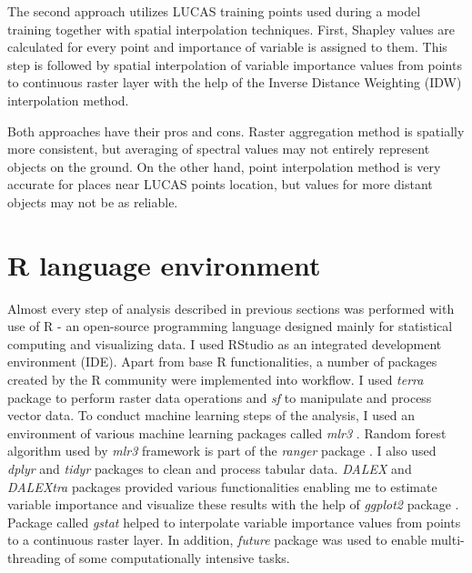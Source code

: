 \documentclass{amuthesis}
\begin{document}
The second approach utilizes LUCAS training points used during a model
training together with spatial interpolation techniques. First, Shapley
values are calculated for every point and importance of variable is
assigned to them. This step is followed by spatial interpolation of
variable importance values from points to continuous raster layer with
the help of the Inverse Distance Weighting (IDW) interpolation method.

Both approaches have their pros and cons. Raster aggregation method is
spatially more consistent, but averaging of spectral values may not
entirely represent objects on the ground. On the other hand, point
interpolation method is very accurate for places near LUCAS points
location, but values for more distant objects may not be as reliable.

\hypertarget{sec-r}{%
\section{R language environment}\label{sec-r}}

Almost every step of analysis described in previous sections was
performed with use of R \autocite{R-base} - an open-source programming
language designed mainly for statistical computing and visualizing data.
I used RStudio \autocite{rstudio_team_rstudio_2020} as an integrated
development environment (IDE). Apart from base R functionalities, a
number of packages created by the R community were implemented into
workflow. I used \emph{terra} package \autocite{R-terra} to perform
raster data operations and \emph{sf} \autocite{R-sf} to manipulate and
process vector data. To conduct machine learning steps of the analysis,
I used an environment of various machine learning packages called
\emph{mlr3} \autocite{R-mlr3}. Random forest algorithm used by
\emph{mlr3} framework is part of the \emph{ranger} package
\autocite{R-ranger}. I also used \emph{dplyr} \autocite{R-dplyr} and
\emph{tidyr} packages \autocite{R-tidyr} to clean and process tabular
data. \emph{DALEX} \autocite{R-DALEX} and \emph{DALEXtra}
\autocite{R-DALEXtra} packages provided various functionalities enabling
me to estimate variable importance and visualize these results with the
help of \emph{ggplot2} package \autocite{R-ggplot2}. Package called
\emph{gstat} \autocite{R-gstat} helped to interpolate variable
importance values from points to a continuous raster layer. In addition,
\emph{future} package \autocite{R-future} was used to enable
multi-threading of some computationally intensive tasks.
\end{document}
